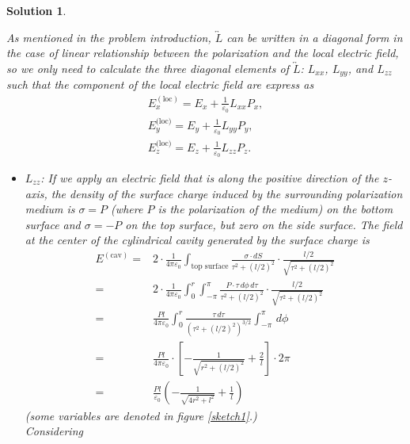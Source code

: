 \documentclass[UTF8,10pt,a4paper]{article}
\theoremstyle{Problem}
\theoremstyle{Solution}
\newtheorem*{sol}{Solution}
\begin{document}
\begin{sol}
\begin{enumerate}
\begin{enumerate}
            As mentioned in the problem introduction, $\overleftrightarrow{L}$ can be written in a diagonal form in the case of linear relationship between the polarization and the local electric field, so we only need to calculate the three diagonal elements of $\overleftrightarrow{L}$: $L_{xx}$, $L_{yy}$, and $L_{zz}$ such that the component of the local electric field are express as
            \begin{gather}
                E_x^{(\text{loc})}=E_x+\frac{1}{\varepsilon_0}L_{xx}P_x,\\
                E_y^{\text{(loc)}}=E_y+\frac{1}{\varepsilon_0}L_{yy}P_y,\\
                E_z^{\text{(loc)}}=E_z+\frac{1}{\varepsilon_0}L_{zz}P_z.
            \end{gather}
            \begin{itemize}
                \item $L_{zz}$: If we apply an electric field that is along the positive direction of the $z$-axis, the density of the surface charge induced by the surrounding polarization medium is $\sigma=P$ (where $P$ is the polarization of the medium) on the bottom surface and $\sigma=-P$ on the top surface, but zero on the side surface. The field at the center of the cylindrical cavity generated by the surface charge is
                \begin{align}
                    \nonumber E^{(\text{cav})}=&2\cdot\frac{1}{4\pi\varepsilon_0}\int_{\text{top surface}}\frac{\sigma\cdot dS}{\tau^2+(l/2)^2}\cdot\frac{l/2}{\sqrt{\tau^2+(l/2)^2}}\\
                    \nonumber=&2\cdot\frac{1}{4\pi\varepsilon_0}\int_0^r\int_{-\pi}^{\pi}\frac{P\cdot \tau\,d\phi\,d\tau}{\tau^2+(l/2)^2}\cdot\frac{l/2}{\sqrt{\tau^2+(l/2)^2}}\\
                    \nonumber=&\frac{Pl}{4\pi\varepsilon_0}\int_0^r\frac{\tau\,d\tau}{(\tau^2+(l/2)^2)^{3/2}}\int_{-\pi}^{\pi}\,d\phi\\
                    \nonumber=&\frac{Pl}{4\pi\varepsilon_0}\cdot\left[-\frac{1}{\sqrt{r^2+(l/2)^2}}+\frac{2}{l}\right]\cdot 2\pi\\
                    =&\frac{Pl}{\varepsilon_0}\left(-\frac{1}{\sqrt{4r^2+l^2}}+\frac{1}{l}\right)
                \end{align}
                (some variables are denoted in figure \ref{sketch1}.)\\
                Considering
                \begin{equation}

\end{equation}
\end{itemize}
\end{enumerate}
\end{enumerate}
\end{sol}
\end{document}
